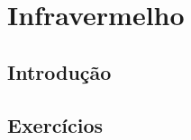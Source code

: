 \chapter{Infravermelho}

\section*{Introdução}

\section{Exercícios}

\question{}

\question{}

\question{}

\question{}

\question{}

